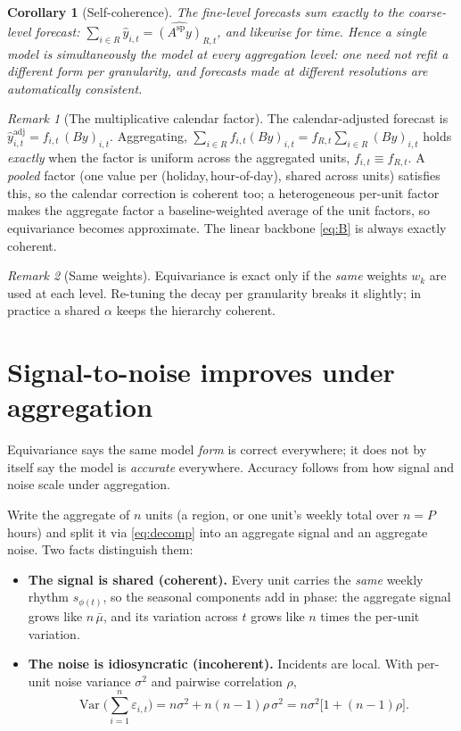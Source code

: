 \documentclass[11pt]{article}
\theoremstyle{plain}
\newtheorem{corollary}{Corollary}
\theoremstyle{remark}
\newtheorem{remark}{Remark}
\newcommand{\Var}{\operatorname{Var}}
\begin{document}
\begin{corollary}[Self-coherence]\label{cor:coh}
The fine-level forecasts sum exactly to the coarse-level forecast:
$\sum_{i\in R}\hat y_{i,t} = \widehat{(A^{\mathrm{sp}}y)}_{R,t}$, and likewise for
time. Hence \emph{a single model is simultaneously the model at every aggregation
level}: one need not refit a different form per granularity, and forecasts made at
different resolutions are automatically consistent.
\end{corollary}

\begin{remark}[The multiplicative calendar factor]
The calendar-adjusted forecast is $\hat y^{\mathrm{adj}}_{i,t}=f_{i,t}\,(By)_{i,t}$.
Aggregating, $\sum_{i\in R} f_{i,t}(By)_{i,t}=f_{R,t}\sum_{i\in R}(By)_{i,t}$ holds
\emph{exactly} when the factor is uniform across the aggregated units,
$f_{i,t}\equiv f_{R,t}$. A \emph{pooled} factor (one value per
(holiday,\,hour-of-day), shared across units) satisfies this, so the calendar
correction is coherent too; a heterogeneous per-unit factor makes the aggregate
factor a baseline-weighted average of the unit factors, so equivariance becomes
approximate. The linear backbone \eqref{eq:B} is always exactly coherent.
\end{remark}

\begin{remark}[Same weights]
Equivariance is exact only if the \emph{same} weights $w_k$ are used at each level.
Re-tuning the decay per granularity breaks it slightly; in practice a shared
$\alpha$ keeps the hierarchy coherent.
\end{remark}

\section{Signal-to-noise improves under aggregation}

Equivariance says the same model \emph{form} is correct everywhere; it does not by
itself say the model is \emph{accurate} everywhere. Accuracy follows from how signal
and noise scale under aggregation.

Write the aggregate of $n$ units (a region, or one unit's weekly total over $n=P$
hours) and split it via \eqref{eq:decomp} into an aggregate signal and an aggregate
noise. Two facts distinguish them:
\begin{itemize}
\item \textbf{The signal is shared (coherent).} Every unit carries the \emph{same}
  weekly rhythm $s_{\phi(t)}$, so the seasonal components add in phase: the aggregate
  signal grows like $n\,\bar\mu$, and its variation across $t$ grows like $n$ times
  the per-unit variation.
\item \textbf{The noise is idiosyncratic (incoherent).} Incidents are local. With
  per-unit noise variance $\sigma^2$ and pairwise correlation $\rho$,
  \begin{equation}
  \Var\!\Big(\textstyle\sum_{i=1}^{n}\varepsilon_{i,t}\Big)
  = n\sigma^2 + n(n-1)\rho\,\sigma^2
  = n\sigma^2\big[1+(n-1)\rho\big].
  \label{eq:noisevar}
  \end{equation}
\end{itemize}
\end{document}
